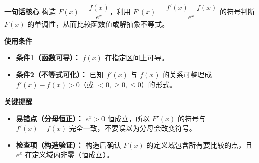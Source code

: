 \begin{summarybox}
	\textbf{\textcolor{CSummary}{一句话核心}}
	构造 $F(x)=\dfrac{f(x)}{e^x}$，利用 $F'(x)=\dfrac{f'(x)-f(x)}{e^x}$ 的符号判断 $F(x)$ 的单调性，从而比较函数值或解抽象不等式。

	\medskip
	\textbf{\textcolor{CSummary}{使用条件}}
	\begin{itemize}[leftmargin=*, itemsep=0.5em, topsep=0.4em]
		\item \textbf{条件1（函数可导）：} $f(x)$ 在指定区间上可导。
		\item \textbf{条件2（不等式可化）：} 已知 $f'(x)$ 与 $f(x)$ 的关系可整理成 $f'(x)-f(x) > 0$（或 $<0, \geq 0, \leq 0$）的形式。
	\end{itemize}

	\medskip
	\textbf{\textcolor{CSummary}{关键提醒}}
	\begin{itemize}[leftmargin=*, itemsep=0.5em, topsep=0.4em]
		\item \textbf{易错点（分母恒正）：} $e^x>0$ 恒成立，所以 $F'(x)$ 的符号与 $f'(x)-f(x)$ 完全一致，不要误以为分母会改变符号。
		\item \textbf{检查项（构造验证）：} 构造后确认 $F(x)$ 的定义域包含所有要比较的点，且 $e^x$ 在定义域内非零（恒成立）。
	\end{itemize}
\end{summarybox}

